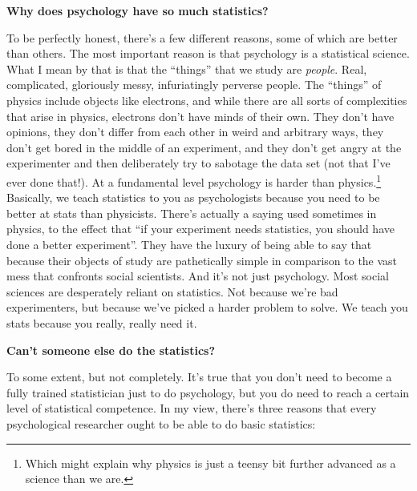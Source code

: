 \documentclass[
  a4paper,
]{book}
\begin{document}
\textbf{Why does psychology have so much statistics?}

To be perfectly honest, there's a few different reasons, some of which
are better than others. The most important reason is that psychology is
a statistical science. What I mean by that is that the ``things'' that
we study are \emph{people}. Real, complicated, gloriously messy,
infuriatingly perverse people. The ``things'' of physics include objects
like electrons, and while there are all sorts of complexities that arise
in physics, electrons don't have minds of their own. They don't have
opinions, they don't differ from each other in weird and arbitrary ways,
they don't get bored in the middle of an experiment, and they don't get
angry at the experimenter and then deliberately try to sabotage the data
set (not that I've ever done that!). At a fundamental level psychology
is harder than physics.\footnote{Which might explain why physics is just
  a teensy bit further advanced as a science than we are.} Basically, we
teach statistics to you as psychologists because you need to be better
at stats than physicists. There's actually a saying used sometimes in
physics, to the effect that ``if your experiment needs statistics, you
should have done a better experiment''. They have the luxury of being
able to say that because their objects of study are pathetically simple
in comparison to the vast mess that confronts social scientists. And
it's not just psychology. Most social sciences are desperately reliant
on statistics. Not because we're bad experimenters, but because we've
picked a harder problem to solve. We teach you stats because you really,
really need it.

\textbf{Can't someone else do the statistics?}

To some extent, but not completely. It's true that you don't need to
become a fully trained statistician just to do psychology, but you do
need to reach a certain level of statistical competence. In my view,
there's three reasons that every psychological researcher ought to be
able to do basic statistics:
\end{document}
